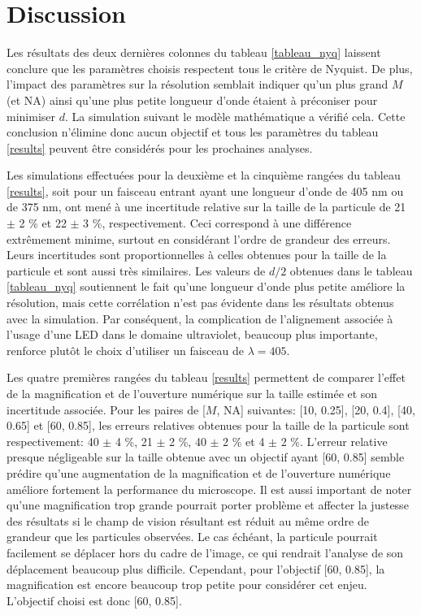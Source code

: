 \documentclass[conference]{IEEEtran}
\begin{document}
\section{Discussion}
Les résultats des deux dernières colonnes du tableau \ref{tableau_nyq} laissent conclure que les paramètres choisis respectent tous le critère de Nyquist.
De plus, l'impact des paramètres sur la résolution semblait indiquer qu'un plus grand $M$ (et NA)
ainsi qu'une plus petite longueur d'onde étaient à préconiser pour minimiser $d$. La simulation suivant
le modèle mathématique a vérifié cela. Cette conclusion n'élimine donc aucun objectif et tous les paramètres du tableau \ref{results} peuvent 
être considérés pour les prochaines analyses.

Les simulations effectuées pour la deuxième et la cinquième rangées du tableau \ref{results}, soit pour un faisceau entrant ayant une longueur d'onde de 405 nm ou de 375 nm,
ont mené à une incertitude relative sur la taille de la particule de 21 $\pm$ 2 \% et 22 $\pm$ 3 \%, respectivement. Ceci correspond à une différence extrêmement minime, surtout en 
considérant l'ordre de grandeur des erreurs. Leurs incertitudes sont proportionnelles à celles obtenues pour la taille de la particule et sont aussi très similaires. Les valeurs de $d/2$ obtenues dans le
tableau \ref{tableau_nyq} soutiennent le fait qu'une longueur d'onde plus petite améliore la résolution, mais cette corrélation n'est pas évidente dans les résultats
obtenus avec la simulation. Par conséquent, la complication de l'alignement associée à l'usage d'une LED dans le domaine ultraviolet, beaucoup plus importante, renforce plutôt le choix d'utiliser un faisceau de $\lambda=405$.

Les quatre premières rangées du tableau \ref{results} permettent de comparer l'effet de la magnification et de l'ouverture numérique sur la taille estimée et son incertitude associée. Pour les paires de [$M$, NA] 
suivantes: [10, 0.25], [20, 0.4], [40, 0.65] et [60, 0.85], les erreurs relatives obtenues pour la taille de la particule sont respectivement: 40 $\pm$ 4 \%, 21 $\pm$ 2 \%, 
40 $\pm$ 2 \% et 4 $\pm$ 2 \%. L'erreur relative presque négligeable sur la taille obtenue avec un objectif ayant [60, 0.85] semble prédire qu'une augmentation de la magnification et de l'ouverture numérique
améliore fortement la performance du microscope. Il est aussi important de noter qu'une magnification trop grande pourrait porter problème et affecter la justesse des résultats si le champ
de vision résultant est réduit au même ordre de grandeur que les particules observées. Le cas échéant, la particule pourrait facilement se déplacer hors du cadre de l'image, ce qui rendrait l'analyse de
son déplacement beaucoup plus difficile. Cependant, pour l'objectif [60, 0.85], la magnification est encore beaucoup trop petite pour considérer cet enjeu. L'objectif choisi est donc [60, 0.85].
\end{document}
